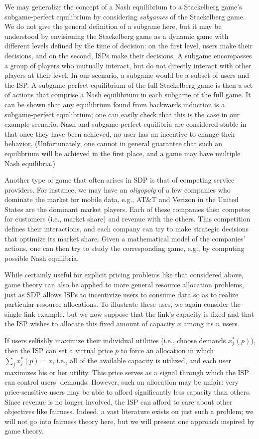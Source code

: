 We may generalize the concept of a Nash equilibrium to a Stackelberg game's subgame-perfect equilibrium by considering \emph{subgames} of the Stackelberg game. We do not give the general definition of a subgame here, but it may be understood by envisioning the Stackelberg game as a dynamic game with different levels defined by the time of decision: on the first level, users make their decisions, and on the second, ISPs make their decisions. A subgame encompasses a group of players who mutually interact, but do not directly interact with other players at their level. In our scenario, a subgame would be a subset of users and the ISP. A subgame-perfect equilibrium of the full Stackelberg game is then a set of actions that comprise a Nash equilibrium in each subgame of the full game. It can be shown that any equilibrium found from backwards induction is a subgame-perfect equilibrium; one can easily check that this is the case in our example scenario. Nash and subgame-perfect equilibria are considered stable in that once they have been achieved, no user has an incentive to change their behavior. (Unfortunately, one cannot in general guarantee that such an equilibrium will be achieved in the first place, and a game may have multiple Nash equilibria.)

Another type of game that often arises in SDP is that of competing service providers. For instance, we may have an \emph{oligopoly} of a few companies who dominate the market for mobile data, e.g., AT\&T and Verizon in the United States are the dominant market players. Each of these companies then competes for customers (i.e., market share) and revenue with the others. This competition defines their interactions, and each company can try to make strategic decisions that optimize its market share. Given a mathematical model of the companies' actions, one can then try to study the corresponding game, e.g., by computing possible Nash equilibria.

While certainly useful for explicit pricing problems like that considered above, game theory can also be applied to more general resource allocation problems, just as SDP allows ISPs to incentivize users to consume data so as to realize particular resource allocations. To illustrate these uses, we again consider the single link example, but we now suppose that the link's capacity is fixed and that the ISP wishes to allocate this fixed amount of capacity $x$ among its $n$ users.

If users selfishly maximize their individual utilities (i.e., choose demands $x_j^\ast(p)$), then the ISP can set a virtual price $p$ to force an allocation in which $\sum_j x_j^\ast(p) = x$, i.e., all of the available capacity is utilized, and each user maximizes his or her utility. This price serves as a signal through which the ISP can control users' demands. However, such an allocation may be unfair: very price-sensitive users may be able to afford significantly less capacity than others. Since revenue is no longer involved, the ISP can afford to care about other objectives like fairness. Indeed, a vast literature exists on just such a problem; we will not go into fairness theory here, but we will present one approach inspired by game theory.


